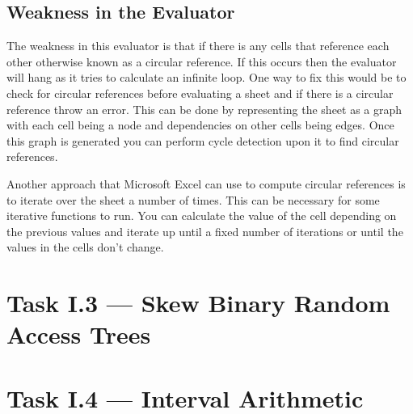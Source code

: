 \documentclass[a4paper]{article}
\begin{document}
\subsection{Weakness in the Evaluator}
The weakness in this evaluator is that if there is any cells that reference each other otherwise known as a circular reference.
If this occurs then the evaluator will hang as it tries to calculate an infinite loop.
One way to fix this would be to check for circular references before evaluating a sheet and if there is a circular reference throw an error.
This can be done by representing the sheet as a graph with each cell being a node and dependencies on other cells being edges.
Once this graph is generated you can perform cycle detection upon it to find circular references.
\par
Another approach that Microsoft Excel can use to compute circular references is to iterate over the sheet a number of times.
This can be necessary for some iterative functions to run.
You can calculate the value of the cell depending on the previous values and iterate up until a fixed number of iterations or until the values in the cells don't change.

\section{Task I.3 --- Skew Binary Random Access Trees}
\section{Task I.4 --- Interval Arithmetic}





% 
\end{document}
